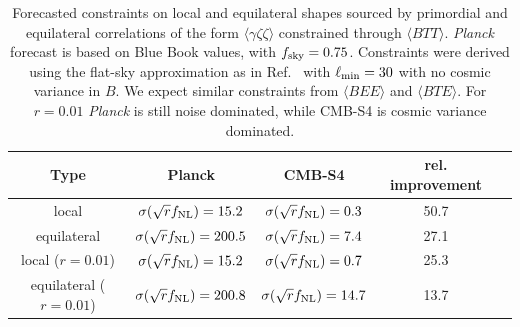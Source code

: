\begin{table}[t]
  \begin{center}
    \begin{tabular}{ | c || c | c | c | c |}
      \hline
      Type & Planck & CMB-S4 & rel. improvement  \\ \hline \hline
      local & $\sigma(\sqrt{r}f_{\rm NL}) = 15.2$ & $\sigma(\sqrt{r}f_{\rm NL}) = 0.3$ & 50.7\\ \hline 
      equilateral &  $\sigma(\sqrt{r}f_{\rm NL}) = 200.5$ & $\sigma(\sqrt{r}f_{\rm NL}) = 7.4$ & 27.1\\ \hline 
      local ($r = 0.01$) & $\sigma(\sqrt{r}f_{\rm NL}) = 15.2$ & $\sigma(\sqrt{r}f_{\rm NL}) = 0.7$ & 25.3\\ \hline 
      equilateral ($r = 0.01$) &  $\sigma(\sqrt{r}f_{\rm NL}) = 200.8$ & $\sigma(\sqrt{r}f_{\rm NL}) = 14.7$ & 13.7\\ \hline 
    \end{tabular}
  \end{center}
  \caption{Forecasted constraints on local and equilateral shapes sourced by primordial and equilateral correlations of the form $\langle \gamma \zeta\zeta \rangle$ constrained through $\langle BTT \rangle$. {\it Planck} forecast is based on Blue Book values, with $f_{\rm sky} = 0.75$. Constraints were derived using the flat-sky approximation as in Ref.~\cite{Meerburg2016} with $\ell_{\rm min} = 30$ with no cosmic variance in $B$.  We expect similar constraints from $\langle BEE \rangle$ and $\langle BTE \rangle$. For $r = 0.01$ {\it Planck} is still noise dominated, while CMB-S4 is cosmic variance dominated. }
\label{tab:fnl_forecast2}
\end{table}



